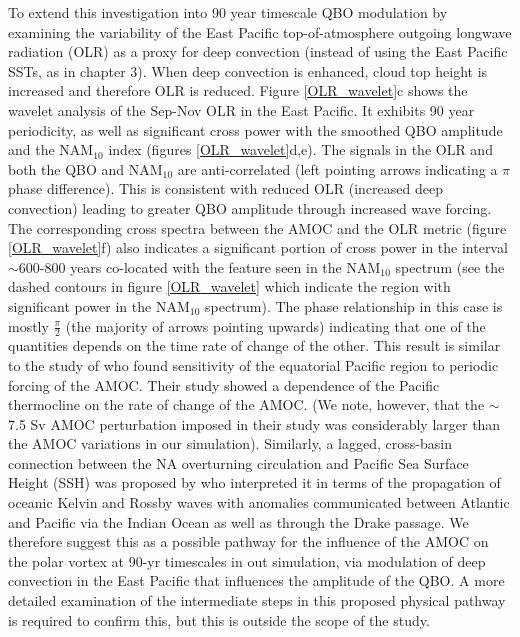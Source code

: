 To extend this investigation into 90 year timescale QBO modulation by examining the variability of the East Pacific top-of-atmosphere outgoing longwave radiation (OLR) as a proxy for deep convection (instead of using the East Pacific SSTs, as in chapter 3). When deep convection is enhanced, cloud top height is increased and therefore OLR is reduced. Figure \ref{OLR_wavelet}c shows the wavelet analysis of the Sep-Nov OLR in the East Pacific. It exhibits 90 year periodicity, as well as significant cross power with the smoothed QBO amplitude and the NAM$_{10}$ index (figures \ref{OLR_wavelet}d,e). The signals in the OLR and both the QBO and NAM$_{10}$ are anti-correlated (left pointing arrows indicating a $\pi$ phase difference). This is consistent with reduced OLR (increased deep convection) leading to greater QBO amplitude through increased wave forcing.  The corresponding cross spectra between the AMOC and the OLR metric (figure \ref{OLR_wavelet}f) also indicates a significant portion of cross power in the interval $\sim$600-800 years co-located with the feature seen in the NAM$_{10}$ spectrum (see the dashed contours in figure \ref{OLR_wavelet} which indicate the region with  significant power in the NAM$_{10}$ spectrum). The phase relationship in this case is mostly $\frac{\pi}{2}$ (the majority of arrows pointing upwards) indicating that one of the quantities depends on the time rate of change of the other. This result is similar to the study of \cite{timmermannENSO2005d} who found sensitivity of the equatorial Pacific region to periodic forcing of the AMOC. Their study showed a dependence of the Pacific thermocline on the rate of change of the AMOC. (We note, however, that the $\sim$7.5 Sv AMOC perturbation imposed in their study was considerably larger than the AMOC variations in our simulation).  Similarly, a lagged, cross-basin connection between the NA overturning circulation and Pacific Sea Surface Height (SSH) was proposed by \cite{cessiGlobal2004} who interpreted it in terms of the propagation of oceanic Kelvin and Rossby waves with anomalies communicated between Atlantic and Pacific via the Indian Ocean as well as through the Drake passage. We therefore suggest this as a possible pathway for the influence of the AMOC on the polar vortex at 90-yr timescales in out simulation, via modulation of deep convection in the East Pacific that influences the amplitude of the QBO. A more detailed examination of the intermediate steps in this proposed physical pathway is required to confirm this, but this is outside the scope of the study.  

